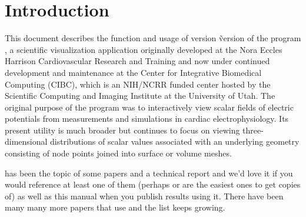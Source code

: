 \section{Introduction}

This document describes the function and usage of version \~version{} of the
program \map{}, a scientific visualization application originally developed
at the Nora Eccles Harrison Cardiovascular Research and Training
 and now under
continued development and maintenance at the Center for Integrative
Biomedical Computing (CIBC), which is an NIH/NCRR funded center hosted by
the Scientific Computing and Imaging Institute
 at the University of
Utah.  The original purpose of the program was to interactively view scalar
fields of electric potentials from measurements and simulations in cardiac
electrophysiology.  Its present utility is much broader but continues to
focus on viewing three-dimensional distributions of scalar values
associated with an underlying geometry consisting of node points joined
into surface or volume meshes.

\map{} has been the topic of some papers
\cite{RSM:Mac92c,RSM:Mac92d,RSM:Mac93,RSM:Mac93a} and a technical report
\cite{RSM:Mac94d} and we'd love it if you would reference at least one of
them (perhaps \cite{RSM:Mac93} or \cite{RSM:Mac93a} are the easiest ones to
get copies of) as well as this manual when you publish results using it.
There have been many many more papers that use \map{} and the list keeps
growing.\cite{RSM:Mac93,RSM:Mac93a,RSM:Mac94d,RSM:Mac94c,RSM:Mac94f,RSM:Mac95d,RSM:Mac97,RSM:Mac98,RSM:Mac2000a,RSM:Mac2001,RSM:Pun98,RSM:Pun99,RSM:Tac92,RSM:Tac92b,RSM:Tac94,RSM:Tac96,RSM:Tac96b,RSM:Tac97b,RSM:Ni98,RSM:Ni99,RSM:Ni2000b,RSM:Lux96,RSM:Lux2001,CRJ:Joh93b,CRJ:Joh93d,CRJ:Joh94,CRJ:Joh94b,RSM:Pun2003,RSM:Ser2002}

